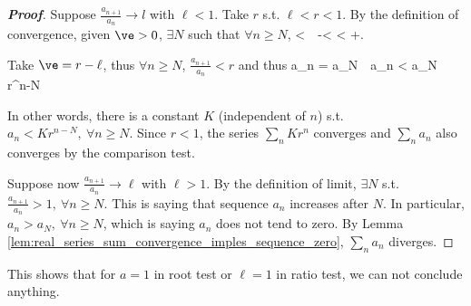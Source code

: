 \begin{proof}[{\bf Proof}]
Suppose $\frac{a_{n+1}}{a_n}\to l$ with $\ell<1$. Take $r$ s.t. $\ell<r<1$. By the definition of convergence, given $\ve>0$, $\exists N$ such that $\forall n\geq N$,
\be
{}<\ve \ \ra \ \ell -\ve <  < \ell+\ve.
\ee

Take $\ve=r-\ell$, thus $\forall n\geq N$, $\frac{a_{n+1}}{a_n} < r$ and thus
\be
a_n = \cdot{}\cdots \cdot {} \cdot a_N\ \ra \ a_n < a_N r^{n-N}
\ee

In other words, there is a constant $K$ (independent of $n$) s.t. $a_n < K r^{n-N}, \ \forall n\geq N$. Since $r<1$, the series $\sum_n K r^n$ converges and $\sum_n a_n$ also converges by the comparison test.

Suppose now $\frac{a_{n+1}}{a_n}\to \ell$ with $\ell>1$. By the definition of limit, $\exists N$ s.t. $\frac{a_{n+1}}{a_n}>1,\ \forall n\geq N$. This is saying that sequence $a_n$ increases after $N$. In particular, $a_n>a_N,\ \forall n\geq N$, which is saying $a_n$ does not tend to zero. By Lemma \ref{lem:real_series_sum_convergence_imples_sequence_zero}, $\sum_n a_n$ diverges.
\end{proof}



\begin{remark}
This shows that for $a=1$ in root test or $\ell=1$ in ratio test, we can not conclude anything.
\end{remark}

